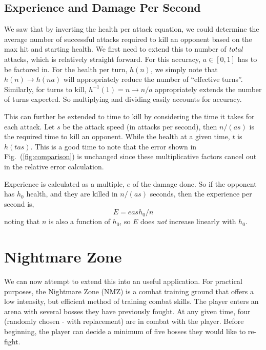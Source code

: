 \documentclass[../../main.tex]{subfiles}
\begin{document}
		\subsection{Experience and Damage Per Second}
			We saw that by inverting the health per attack equation, we could determine the average number of successful attacks required to kill an opponent based on the max hit and starting health. We first need to extend this to number of \textit{total} attacks, which is relatively straight forward. For this accuracy, $a\in[0, 1]$ has to be factored in. For the health per turn, $h(n)$, we simply note that $h(n)\to h(na)$ will appropriately reduce the number of ``effective turns''. Similarly, for turns to kill, $h^{-1}(1)=n\to n/a$ appropriately extends the number of turns expected. So multiplying and dividing easily accounts for accuracy.

			This can further be extended to time to kill by considering the time it takes for each attack. Let $s$ be the attack speed (in attacks per second), then $n/(as)$ is the required time to kill an opponent. While the health at a given time, $t$ is $h(tas)$. This is a good time to note that the error shown in Fig.~(\ref{fig:comparison}) is unchanged since these multiplicative factors cancel out in the relative error calculation.

			Experience is calculated as a multiple, $e$ of the damage done. So if the opponent has $h_0$ health, and they are killed in $n/(as)$ seconds, then the experience per second is,
			\begin{equation}
				\boxed{E=eash_0/n}
			\end{equation}
			noting that $n$ is also a function of $h_0$, so $E$ does \emph{not} increase linearly with $h_0$.

	\section{Nightmare Zone}
		We can now attempt to extend this into an useful application. For practical purposes, the Nightmare Zone (NMZ) is a combat training ground that offers a low intensity, but efficient method of training combat skills. The player enters an arena with several bosses they have previously fought. At any given time, four (randomly chosen - with replacement) are in combat with the player. Before beginning, the player can decide a minimum of five bosses they would like to re-fight.
\end{document}
